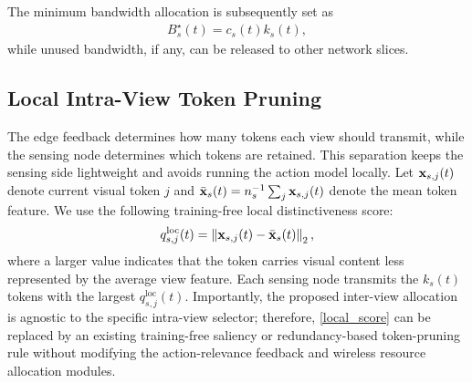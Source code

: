 \documentclass[lettersize,journal]{IEEEtran}
\theoremstyle{custom}
\begin{document}
The minimum bandwidth allocation is subsequently set as
\begin{align}
    B_s^{\star}(t)=c_s(t)k_s(t),
    \label{optimal_bandwidth}
\end{align}
while unused bandwidth, if any, can be released to other network slices.

\subsection{Local Intra-View Token Pruning}
The edge feedback determines how many tokens each view should transmit, while the sensing node determines which tokens are retained. This separation keeps the sensing side lightweight and avoids running the action model locally. Let ${\bf x}_{s,j}(t)$ denote current visual token $j$ and $\bar{\bf x}_s(t)=n_s^{-1}\sum_j{\bf x}_{s,j}(t)$ denote the mean token feature. We use the following training-free local distinctiveness score:
\begin{align}
    q_{s,j}^{\mathrm{loc}}(t)
    = \left\|{\bf x}_{s,j}(t)-\bar{\bf x}_s(t)\right\|_2,
    \label{local_score}
\end{align}
where a larger value indicates that the token carries visual content less represented by the average view feature. Each sensing node transmits the $k_s(t)$ tokens with the largest $q_{s,j}^{\mathrm{loc}}(t)$. Importantly, the proposed inter-view allocation is agnostic to the specific intra-view selector; therefore, \eqref{local_score} can be replaced by an existing training-free saliency or redundancy-based token-pruning rule without modifying the action-relevance feedback and wireless resource allocation modules.
\end{document}
